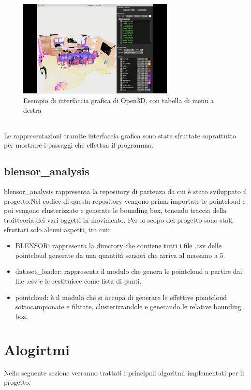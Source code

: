\documentclass[italian]{report}
\begin{document}
\begin{figure}[H]
	\centering
	\includegraphics[width=0.7\textwidth]{o3dInterface}
	\footnotesize
	\caption{Esempio di interfaccia grafica di Open3D, con tabella di menu a destra}
\end{figure}\\
Le rappresentazioni tramite interfaccia grafica sono state sfruttate soprattutto per mostrare i passaggi che effettua il programma.

\section{blensor\_analysis}
blensor\_analysis rappresenta la repository di partenza da cui è stato sviluppato il progetto.Nel codice di questa repository vengono prima importate le pointcloud e poi vengono clusterizzate e generate le bounding box, tenendo traccia della traitteoria dei vari oggetti in movimento. Per lo scopo del progetto sono stati sfruttati solo alcuni aspetti, tra cui:
\begin{itemize}
	\item BLENSOR: rappresenta la directory che contiene tutti i file .csv delle pointcloud generate da una quantità sensori che arriva al massimo a 5.
	\item dataset\_loader: rappresenta il modulo che genera le pointcloud a partire dai file .csv e le restituisce come lista di punti.
	\item pointcloud: è il modulo che si occupa di generare le effettive pointcloud sottocampionate e filtrate, clusterizzandole e generando le relative bounding box.
\end{itemize}

\newpage
\chapter{Alogirtmi}
Nella seguente sezione verranno trattati i principali algoritmi implementati per il progetto.
\end{document}
